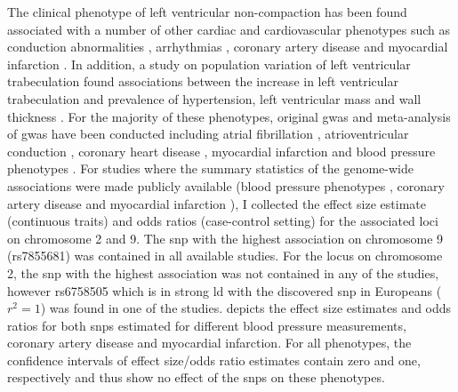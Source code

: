 The clinical phenotype of left ventricular non-compaction has been found associated with a number of other cardiac and cardiovascular phenotypes such as conduction abnormalities \citep{Yousef2009}, arrhythmias \citep{Ritter1997,Oechslin2000,Yousef2009}, coronary artery disease \citep{Ritter1997,Junga1999,Jenni2002,Soler2002} and myocardial infarction \citep{Swinkels2007,Toufan2012,Guvens2012}. In addition, a study on population variation of left ventricular trabeculation found associations between the increase in left ventricular trabeculation and prevalence of hypertension, left ventricular mass and wall thickness \citep{Captur2015}. For the majority of these phenotypes, original \gls{gwas} and meta-analysis of \gls{gwas} have been conducted including atrial fibrillation \citep{Gudbjartsson2007,Christophersen2017}, atrioventricular conduction \citep{Denny2010}, coronary heart disease \citep{Schunkert2011,Lee2013a,Nikpay2015}, myocardial infarction \citep{Kathiresan2009,Hirokawa2015,Nikpay2015,Dehghan2016} and blood pressure phenotypes \citep{Ehret2011,Wain2011}. For studies where the summary statistics of the genome-wide associations were made publicly available (blood pressure phenotypes \citep{Ehret2011,Wain2011}, coronary artery disease \citep{Schunkert2011} and myocardial infarction \citep{Nikpay2015}), I collected the effect size estimate (continuous traits) and odds ratios (case-control setting) for the associated loci on chromosome 2 and 9. The \gls{snp} with the highest association on chromosome 9 (rs7855681) was contained in all available studies. For the locus on chromosome 2, the \gls{snp} with the highest association was not contained in any of the studies, however rs6758505 which is in strong \gls{ld} with the discovered \gls{snp} in Europeans (\(r^2=1\)) was found in one of the studies.  depicts the effect size estimates and odds ratios for both \glspl{snp}  estimated for different blood pressure measurements, coronary artery disease and myocardial infarction. For all phenotypes, the confidence intervals of effect size/odds ratio estimates contain zero and one, respectively and thus show no effect of the \glspl{snp}  on these phenotypes. 
%
